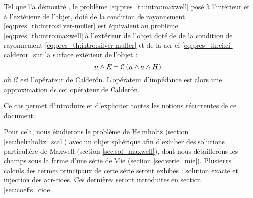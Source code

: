 Tel que l'a démontré \cite[Theorem 1., p.~1042]{lafitte_diffraction_1998}, le problème \eqref{eq:pres_th:intro:maxwell}  posé à l'intérieur et à l'extérieur de l'objet, doté de la condition de rayonnement \eqref{eq:pres_th:intro:silver-muller} est équivalent au problème \eqref{eq:pres_th:intro:maxwell} à l'extérieur de l'objet doté de de la condition de rayonnement \eqref{eq:pres_th:intro:silver-muller} et de la \gls{acr-ci} \eqref{eq:pres_th:ci:ci-calderon} sur la surface extérieur de l'objet : 
\begin{equation}
\label{eq:pres_th:ci:ci-calderon}
\underline{n} \wedge \underline{E} = \mathcal{C}\left(\underline{n} \wedge \underline{n} \wedge \underline{H}\right)
\end{equation}
où $ \mathcal{C}$ est l'opérateur de Calderón.
L'opérateur d'impédance est alors une approximation de cet opérateur de Calderón.

Ce cas permet d'introduire et d'expliciter toutes les notions récurrentes de ce document.


Pour cela, nous étudierons le problème de Helmholtz (section \ref{sec:helmholtz_scal}) avec un objet sphérique afin d'exhiber des solutions particulière de Maxwell (section \ref{sec:sol_maxwell}), dont nous détaillerons les champs sous la forme d'une série de Mie (section \ref{sec:serie_mie}).
Plusieurs calculs des termes principaux de cette série seront exhibés : solution exacte et injection des \glspl{acr-cioe}.
Ces dernières seront introduites en section  \ref{sec:coeffs_cioe}.



